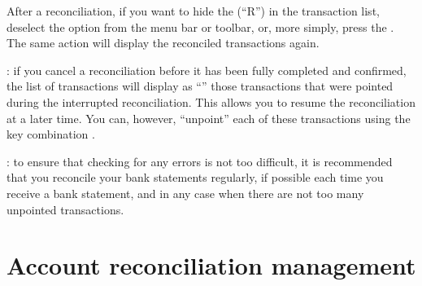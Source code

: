 After a reconciliation, if you want to hide the  (\enquote{R}) in the transaction list, deselect the  option from the menu bar or toolbar, or, more simply, press the . The same action will display the reconciled transactions again.

\Note{}: if you cancel a reconciliation before it has been fully completed and confirmed, the list of transactions will display as \enquote{} those transactions that were pointed during the interrupted reconciliation. This allows you to resume the reconciliation at a later time. You can, however, \enquote{unpoint} each of these transactions using the key combination .

\Note{}: to ensure that checking for any errors is not too difficult, it is recommended that you reconcile your bank statements regularly, if possible each time you receive a bank statement, and in any case when there are not too many unpointed transactions.


\section{Account reconciliation management\label{reconciliation-manage}}


